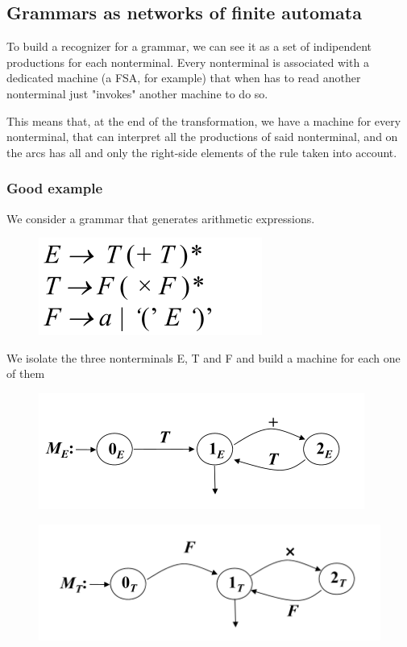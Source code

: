 		\subsection{Grammars as networks of finite automata}
			To build a recognizer for a grammar, we can see it as a set of indipendent productions for each nonterminal. Every nonterminal is associated with a 
			dedicated machine (a FSA, for example) that when has to read another nonterminal just "invokes" another machine to do so.

			This means that, at the end of the transformation, we have a machine for every nonterminal, that can interpret all the productions of said nonterminal, 
			and on the arcs has all and only the right-side elements of the rule taken into account.
			
			\subsubsection{Good example}
				We consider a grammar that generates arithmetic expressions.
				\begin{figure}[htp]
					\begin{center}
						\includegraphics[]{./images/exGrammar.png}
					\end{center}
				\end{figure}
				We isolate the three nonterminals E, T and F and build a machine for each one of them
				\begin{figure}[htp]
					\begin{center}
						\includegraphics[]{./images/exE.png}
					\end{center}
				\end{figure}
				\begin{figure}[htp]
					\begin{center}
						\includegraphics[]{./images/exT.png}
					\end{center}
				\end{figure}
